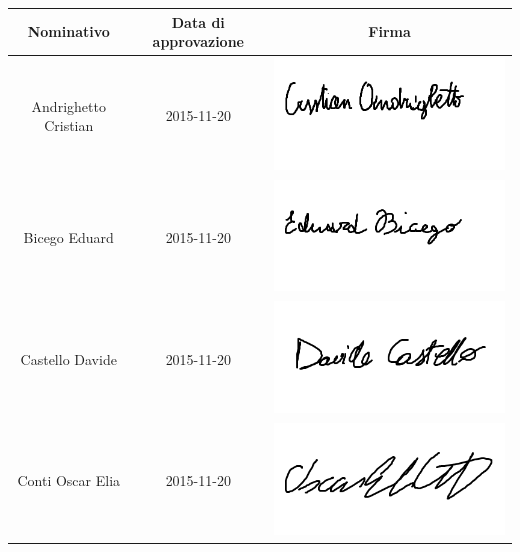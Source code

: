 \documentclass[PianoProgetto.tex]{subfiles}
\begin{document}
\begin{appendices}
\begin{table}[h]
		\begin{tabularx}{\textwidth}{C C C}
			\toprule
			\textbf{Nominativo} & \textbf{Data di approvazione} & \textbf{Firma} \\
			\midrule
			Andrighetto Cristian & 2015-11-20 &	\includegraphics[scale=0.3, trim=0 2.3cm 0 0.3cm]{firme_componenti/candrig_firma} \\[1.2ex]
			Bicego Eduard & 2015-11-20 & \includegraphics[scale=0.4, trim=0 3cm 0 0.1cm]{firme_componenti/edubic_firma} \\[1.2ex]
			Castello Davide	& 2015-11-20 & \includegraphics[scale=0.3, trim=0 2.3cm 0 0.3cm]{firme_componenti/dcastello_firma} \\[1.2ex]
			Conti Oscar Elia & 2015-11-20 &	 \includegraphics[scale=0.3, trim=0 2.3cm 0 0.3cm]{firme_componenti/oconti_firma} \\[1.2ex]

\end{tabularx}
\end{table}
\end{appendices}
\end{document}
